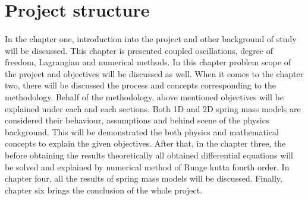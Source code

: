 \section{Project structure}
\paragraph{}

In the chapter one, introduction into the project and other background of study will be discussed. This chapter is presented coupled oscillations, degree of freedom, Lagrangian and numerical methods. In this chapter problem scope of the project and objectives will be discussed as well.  When it comes to the chapter two, there will be discussed the process and concepts corresponding to the methodology. Behalf of the methodology, above mentioned objectives will be explained under each and each sections. Both 1D and 2D spring mass models are considered their behaviour, assumptions and behind scene of the physics background. This will be demonstrated the both physics and mathematical concepts to explain the given objectives.  After that, in the chapter three,  the before obtaining the results theoretically  all obtained differential equations will be solved and explained by numerical method of Runge kutta fourth order. In chapter four, all the results of spring mass models will be discussed. Finally, chapter six brings the conclusion of the whole project.   
\paragraph{}






































